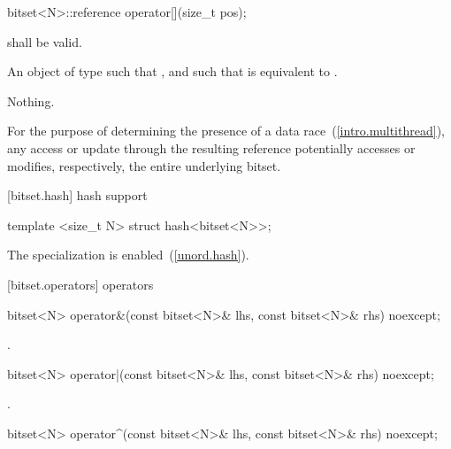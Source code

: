 %
\begin{itemdecl}
bitset<N>::reference operator[](size_t pos);
\end{itemdecl}

\begin{itemdescr}
\pnum
\requires
{} shall be valid.

\pnum
\returns
An object of type
such that
,
and such that
is equivalent to
.

\pnum
\throws Nothing.

\pnum
\remarks For the purpose of determining the presence of a data
race~(\ref{intro.multithread}), any access or update through the resulting
reference potentially accesses or modifies, respectively, the entire
underlying bitset.
\end{itemdescr}

[bitset.hash]{ hash support}

%
\begin{itemdecl}
template <size_t N> struct hash<bitset<N>>;
\end{itemdecl}

\begin{itemdescr}
\pnum The specialization is enabled~(\ref{unord.hash}).
\end{itemdescr}


[bitset.operators]{ operators}

%
\begin{itemdecl}
bitset<N> operator&(const bitset<N>& lhs, const bitset<N>& rhs) noexcept;
\end{itemdecl}

\begin{itemdescr}
\pnum
\returns
{}.
\end{itemdescr}

%
\begin{itemdecl}
bitset<N> operator|(const bitset<N>& lhs, const bitset<N>& rhs) noexcept;
\end{itemdecl}

\begin{itemdescr}
\pnum
\returns
{}.
\end{itemdescr}

%
\begin{itemdecl}
bitset<N> operator^(const bitset<N>& lhs, const bitset<N>& rhs) noexcept;
\end{itemdecl}

